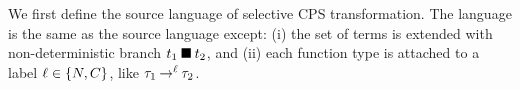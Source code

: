 
%

We first define the source language of selective CPS transformation.
The language is the same as the source language except: (i) the set
of terms is extended with non-deterministic branch ${t_1}\mathbin{\blacksquare}{t_2}$, and (ii)
each function type is attached to a label $\ell \in \{N,C\}$, like
${\tau_1}\mathbin{\rightarrow^{\ell}}{\tau_2}$.

